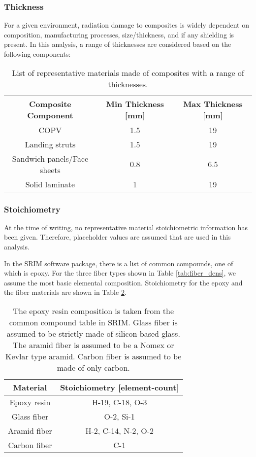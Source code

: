 \documentclass{hitec}
\begin{document}
\subsubsection{Thickness}
For a given environment, radiation damage to composites is widely dependent on composition, manufacturing processes, size/thickness, and if any shielding is present. In this analysis, a range of thicknesses are considered based on the following components:

\begin{table}[h]\centering
	\caption{List of representative materials made of composites with a range of thicknesses.}\label{tab:thickness_comp}
	\begin{tabular}{|c | c | c |}\hline
		Composite Component & Min Thickness [mm] & Max Thickness [mm] \\\hline
		COPV & 1.5 & 19 \\\hline
		Landing struts	& 1.5 & 19 \\\hline
		Sandwich panels/Face sheets	& 0.8 & 6.5 \\\hline
		Solid laminate	& 1 & 19 \\\hline	
	\end{tabular}
\end{table}

\subsubsection{Stoichiometry}

At the time of writing, no representative material stoichiometric information has been given. Therefore, placeholder values are assumed that are used in this analysis.

In the SRIM software package, there is a list of common compounds, one of which is epoxy. For the three fiber types shown in Table \ref{tab:fiber_dens}, we assume the most basic elemental composition. Stoichiometry for the epoxy and the fiber materials are shown in Table \ref{tab:stoichiometry}.

\begin{table}[h]\centering
	\caption{The epoxy resin composition is taken from the common compound table in SRIM. Glass fiber is assumed to be strictly made of silicon-based glass. The aramid fiber is assumed to be a Nomex or Kevlar type aramid. Carbon fiber is assumed to be made of only carbon.}\label{tab:stoichiometry}
	\begin{tabular}{|c | c |}\hline
		Material & Stoichiometry [element-count] \\\hline
		Epoxy resin & H-19, C-18, O-3 \\\hline
		Glass fiber & O-2, Si-1 \\\hline
		Aramid fiber & H-2, C-14, N-2, O-2  \\\hline
		Carbon fiber & C-1  \\\hline	
	\end{tabular}
\end{table}
\end{document}
